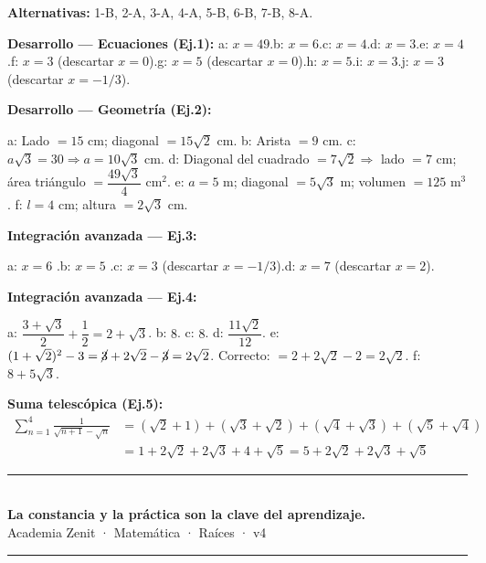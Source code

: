 \documentclass[11pt, letterpaper]{article}
\begin{document}
\begin{tcolorbox}[answerbox, title={Respuestas}]
\textbf{Alternativas:} 1-B, 2-A, 3-A, 4-A, 5-B, 6-B, 7-B, 8-A.

\medskip
\textbf{Desarrollo — Ecuaciones (Ej.1):}
a: $x=49$.\quad b: $x=6$.\quad c: $x=4$.\quad d: $x=3$.\quad e: $x=4$.\quad f: $x=3$ (descartar $x=0$).\quad g: $x=5$ (descartar $x=0$).\quad h: $x=5$.\quad i: $x=3$.\quad j: $x=3$ (descartar $x=-1/3$).

\medskip
\textbf{Desarrollo — Geometría (Ej.2):}

a: Lado $=15$ cm; diagonal $=15\sqrt{2}$ cm.\quad
b: Arista $=9$ cm.\quad
c: $a\sqrt{3}=30\Rightarrow a=10\sqrt{3}$ cm.\quad
d: Diagonal del cuadrado $=7\sqrt{2}\Rightarrow$ lado $=7$ cm; área triángulo $=\dfrac{49\sqrt{3}}{4}$ cm$^2$.\quad
e: $a=5$ m; diagonal $=5\sqrt{3}$ m; volumen $=125$ m$^3$.\quad
f: $l=4$ cm; altura $=2\sqrt{3}$ cm.

\medskip
\textbf{Integración avanzada — Ej.3:}

a: $x=6$ \checkmark.\quad b: $x=5$ \checkmark.\quad c: $x=3$ (descartar $x=-1/3$).\quad d: $x=7$ (descartar $x=2$).

\medskip
\textbf{Integración avanzada — Ej.4:}

a: $\dfrac{3+\sqrt{3}}{2}+\dfrac{1}{2}=2+\sqrt{3}$.\quad
b: $8$.\quad
c: $8$.\quad
d: $\dfrac{11\sqrt{2}}{12}$.\quad
e: $(1+\sqrt{2})^2-3=\cancel{3}+2\sqrt{2}-\cancel{3}=2\sqrt{2}$. Correcto: $=2+2\sqrt{2}-2=2\sqrt{2}$.\quad
f: $8+5\sqrt{3}$.

\medskip
\textbf{Suma telescópica (Ej.5):}
\begin{align*}
\sum_{n=1}^{4}\frac{1}{\sqrt{n+1}-\sqrt{n}}&=(\sqrt{2}+1)+(\sqrt{3}+\sqrt{2})+(\sqrt{4}+\sqrt{3})+(\sqrt{5}+\sqrt{4})\\
&=1+2\sqrt{2}+2\sqrt{3}+4+\sqrt{5}=5+2\sqrt{2}+2\sqrt{3}+\sqrt{5}
\end{align*}
\end{tcolorbox}

\vspace{8pt}
\begin{center}
  \rule{\linewidth}{1.5pt}\\[4pt]
  {\large\bfseries\color{zenitnavy} La constancia y la práctica son la clave del aprendizaje.}\\[2pt]
  {\color{zenitgold}\small Academia Zenit · Matemática · Raíces · v4}
  \rule{\linewidth}{1.5pt}
\end{center}
\end{document}

